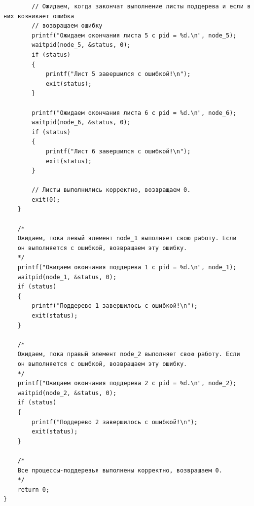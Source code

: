 \documentclass[a4paper,14pt]{extarticle}
\begin{document}
\begin{verbatim}
        // Ожидаем, когда закончат выполнение листы поддерева и если в них возникает ошибка
        // возвращаем ошибку
        printf("Ожидаем окончания листа 5 с pid = %d.\n", node_5);
        waitpid(node_5, &status, 0);
        if (status)
        {
            printf("Лист 5 завершился с ошибкой!\n");
            exit(status);
        }

        printf("Ожидаем окончания листа 6 с pid = %d.\n", node_6);
        waitpid(node_6, &status, 0);
        if (status)
        {
            printf("Лист 6 завершился с ошибкой!\n");
            exit(status);
        }

        // Листы выполнились корректно, возвращаем 0.
        exit(0);
    }

    /*
    Ожидаем, пока левый элемент node_1 выполняет свою работу. Если
    он выполняется с ошибкой, возвращаем эту ошибку.
    */
    printf("Ожидаем окончания поддерева 1 с pid = %d.\n", node_1);
    waitpid(node_1, &status, 0);
    if (status)
    {
        printf("Поддерево 1 завершилось с ошибкой!\n");
        exit(status);
    }

    /*
    Ожидаем, пока правый элемент node_2 выполняет свою работу. Если
    он выполняется с ошибкой, возвращаем эту ошибку.
    */
    printf("Ожидаем окончания поддерева 2 с pid = %d.\n", node_2);
    waitpid(node_2, &status, 0);
    if (status)
    {
        printf("Поддерево 2 завершилось с ошибкой!\n");
        exit(status);
    }

    /*
    Все процессы-поддеревья выполнены корректно, возвращаем 0.
    */
    return 0;
}
\end{verbatim}
\end{document}
